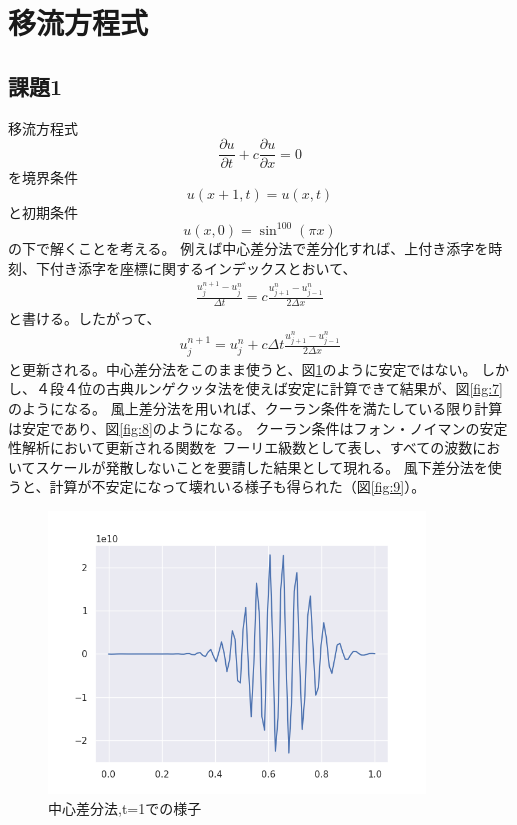 \documentclass{jsarticle}
\begin{document}
\section{移流方程式}
\subsection{課題1}
移流方程式
\begin{equation}
    \frac{\partial u}{\partial t} + c\frac{\partial u}{\partial x} = 0
\end{equation}
を境界条件
\begin{equation}
    u(x+1, t) = u(x, t)
\end{equation}
と初期条件
\begin{equation}
    u(x, 0) = \sin^{100} (\pi x) 
\end{equation}
の下で解くことを考える。
例えば中心差分法で差分化すれば、上付き添字を時刻、下付き添字を座標に関するインデックスとおいて、
\begin{align}
    \frac{u^{n+1}_j - u^{n}_j}{\Delta t} = c \frac{u^n_{j+1} - u^n_{j-1}}{2\Delta x}
\end{align}
と書ける。したがって、
\begin{align}
    u^{n+1}_j  =  u^{n}_j+ c \Delta t\frac{u^n_{j+1} - u^n_{j-1}}{2\Delta x}
\end{align}
と更新される。中心差分法をこのまま使うと、図\ref{fig:6}のように安定ではない。
しかし、４段４位の古典ルンゲクッタ法を使えば安定に計算できて結果が、図\ref{fig:7}のようになる。
風上差分法を用いれば、クーラン条件を満たしている限り計算は安定であり、図\ref{fig:8}のようになる。
クーラン条件はフォン・ノイマンの安定性解析において更新される関数を
フーリエ級数として表し、すべての波数においてスケールが発散しないことを要請した結果として現れる。
風下差分法を使うと、計算が不安定になって壊れいる様子も得られた（図\ref{fig:9}）。
\begin{figure}[htbp]
    \includegraphics[clip,width=10.0cm]{./adv_center.png}
    \caption{中心差分法,t=1での様子}
    \label{fig:6}
\end{figure}
\end{document}
